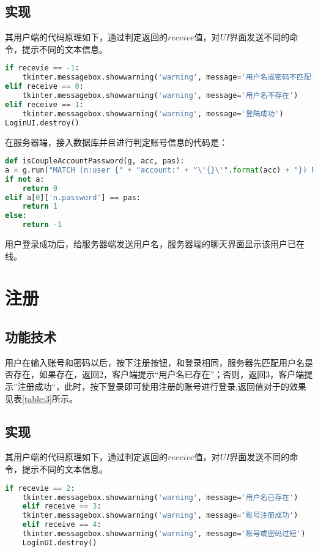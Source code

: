\documentclass[forprint]{sql}
\begin{document}
\subsection{实现}

其用户端的代码原理如下，通过判定返回的$receive$值，对$UI$界面发送不同的命令，提示不同的文本信息。

\begin{lstlisting}[language=Python]
if recevie == -1:
	tkinter.messagebox.showwarning('warning', message='用户名或密码不匹配')
elif receive == 0:
	tkinter.messagebox.showwarning('warning', message='用户名不存在')
elif receive == 1:
	tkinter.messagebox.showwarning('warning', message='登陆成功')
LoginUI.destroy()
\end{lstlisting} 

在服务器端，接入数据库并且进行判定账号信息的代码是：

\begin{lstlisting}[language=Python]
def isCoupleAccountPassword(g, acc, pas):
a = g.run("MATCH (n:user {" + "account:" + "\'{}\'".format(acc) + "}) RETURN n.password").data()
if not a:
	return 0
elif a[0]['n.password'] == pas:
	return 1
else:
	return -1
\end{lstlisting} 

用户登录成功后，给服务器端发送用户名，服务器端的聊天界面显示该用户已在线。

\section{注册}

\subsection{功能技术}

用户在输入账号和密码以后，按下注册按钮，和登录相同，服务器先匹配用户名是否存在，如果存在，返回2，客户端提示“用户名已存在”；否则，返回3，客户端提示”注册成功“，此时，按下登录即可使用注册的账号进行登录,返回值对于的效果见表\ref{table:3}所示。

\subsection{实现}

其用户端的代码原理如下，通过判定返回的$receive$值，对$UI$界面发送不同的命令，提示不同的文本信息。

\begin{lstlisting}[language=Python]
	if recevie == 2:
	tkinter.messagebox.showwarning('warning', message='用户名已存在')
	elif receive == 3:
	tkinter.messagebox.showwarning('warning', message='账号注册成功')
	elif receive == 4:
	tkinter.messagebox.showwarning('warning', message='账号或密码过短')
	LoginUI.destroy()
\end{lstlisting} 
\end{document}

